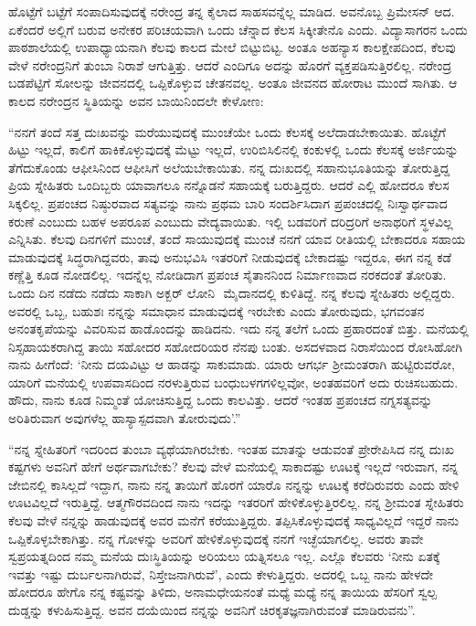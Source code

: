 ಹೊಟ್ಟೆಗೆ ಬಟ್ಟೆಗೆ ಸಂಪಾದಿಸುವುದಕ್ಕೆ ನರೇಂದ್ರ ತನ್ನ ಕೈಲಾದ ಸಾಹಸವನ್ನೆಲ್ಲ ಮಾಡಿದ. ಅವನೊಬ್ಬ ಪ್ರಿಮೇಸನ್ ಆದ. ಏಕೆಂದರೆ ಅಲ್ಲಿಗೆ ಬರುವ ಅನೇಕರ ಪರಿಚಯವಾಗಿ ಒಂದು ಚೆನ್ನಾದ ಕೆಲಸ ಸಿಕ್ಕೀತೇನೊ ಎಂದು. ವಿದ್ಯಾಸಾಗರನ ಒಂದು ಪಾಠಶಾಲೆಯಲ್ಲಿ ಉಪಾಧ್ಯಾಯನಾಗಿ ಕೆಲವು ಕಾಲದ ಮೇಲೆ ಬಿಟ್ಟುಬಿಟ್ಟ. ಅಂತೂ ಅಹನ್ಯಾಸ ಕಾಲಕ್ಷೇಪದಿಂದ, ಕೆಲವು ವೇಳೆ ನರೇಂದ್ರನಿಗೆ ತುಂಬಾ ನಿರಾಶೆ ಆಗುತ್ತಿತ್ತು. ಆದರೆ ಎಂದಿಗೂ ಅದನ್ನು ಹೊರಗೆ ವ್ಯಕ್ತಪಡಿಸುತ್ತಿರಲಿಲ್ಲ. ನರೇಂದ್ರ ಬಡಪೆಟ್ಟಿಗೆ ಸೋಲನ್ನು ಜೀವನದಲ್ಲಿ ಒಪ್ಪಿಕೊಳ್ಳುವ ಚೇತನವಲ್ಲ. ಅಂತೂ ಜೀವನದ ಹೋರಾಟ ಮುಂದೆ ಸಾಗಿತು. ಆ ಕಾಲದ ನರೇಂದ್ರನ ಸ್ಥಿತಿಯನ್ನು ಅವನ ಬಾಯಿನಿಂದಲೇ ಕೇಳೋಣ:

“ನನಗೆ ತಂದೆ ಸತ್ತ ದುಃಖವನ್ನು ಮರೆಯುವುದಕ್ಕೆ ಮುಂಚೆಯೇ ಒಂದು ಕೆಲಸಕ್ಕೆ ಅಲೆದಾಡಬೇಕಾಯಿತು. ಹೊಟ್ಟೆಗೆ ಹಿಟ್ಟು ಇಲ್ಲದೆ, ಕಾಲಿಗೆ ಹಾಕಿಕೊಳ್ಳುವುದಕ್ಕೆ ಮೆಟ್ಟು ಇಲ್ಲದೆ, ಉರಿಬಿಸಿಲಿನಲ್ಲಿ ಕಂಕುಳಲ್ಲಿ ಒಂದು ಕೆಲಸಕ್ಕೆ ಅರ್ಜಿಯನ್ನು ತೆಗೆದುಕೊಂಡು ಆಫೀಸಿನಿಂದ ಆಫೀಸಿಗೆ ಅಲೆಯಬೇಕಾಯಿತು. ನನ್ನ ದುಃಖದಲ್ಲಿ ಸಹಾನುಭೂತಿಯನ್ನು ತೋರುತ್ತಿದ್ದ ಪ್ರಿಯ ಸ್ನೇಹಿತರು ಒಂದಿಬ್ಬರು ಯಾವಾಗಲೂ ನನ್ನೊಡನೆ ಸಹಾಯಕ್ಕೆ ಬರುತ್ತಿದ್ದರು. ಆದರೆ ಎಲ್ಲಿ ಹೋದರೂ ಕೆಲಸ ಸಿಕ್ಕಲಿಲ್ಲ. ಪ್ರಪಂಚದ ನಿಷ್ಠುರವಾದ ಸತ್ಯವನ್ನು ನಾನು ಪ್ರಥಮ ಬಾರಿ ಸಂದರ್ಶಿಸಿದಾಗ ಪ್ರಪಂಚದಲ್ಲಿ ನಿಃಸ್ವಾರ್ಥವಾದ ಕರುಣೆ ಎಂಬುದು ಬಹಳ ಅಪರೂಪ ಎಂಬುದು ವೇದ್ಯವಾಯಿತು. ಇಲ್ಲಿ ಬಡವರಿಗೆ ದರಿದ್ರರಿಗೆ ಅನಾಥರಿಗೆ ಸ್ಥಳವಿಲ್ಲ ಎನ್ನಿಸಿತು. ಕೆಲವು ದಿನಗಳಿಗೆ ಮುಂಚೆ, ತಂದೆ ಸಾಯುವುದಕ್ಕೆ ಮುಂಚೆ ನನಗೆ ಯಾವ ರೀತಿಯಲ್ಲಿ ಬೇಕಾದರೂ ಸಹಾಯ ಮಾಡುವುದಕ್ಕೆ ಸಿದ್ಧರಾಗಿದ್ದವರು, ತಾವು ಅನುಭವಿಸಿ ಇತರರಿಗೆ ನೀಡುವುದಕ್ಕೆ ಬೇಕಾದಷ್ಟು ಇದ್ದರೂ, ಈಗ ನನ್ನ ಕಡೆ ಕಣ್ಣೆತ್ತಿ ಕೂಡ ನೋಡಲಿಲ್ಲ. ಇದನ್ನೆಲ್ಲ ನೋಡಿದಾಗ ಪ್ರಪಂಚ ಸೈತಾನನಿಂದ ನಿರ್ಮಾಣವಾದ ನರಕದಂತೆ ತೋರಿತು. ಒಂದು ದಿನ ನಡೆದು ನಡೆದು ಸಾಕಾಗಿ ಅಕ್ಬರ್ ಲೋನಿ ‍ ಮೈದಾನದಲ್ಲಿ ಕುಳಿತಿದ್ದೆ. ನನ್ನ ಕೆಲವು ಸ್ನೇಹಿತರು ಅಲ್ಲಿದ್ದರು. ಅವರಲ್ಲಿ ಒಬ್ಬ, ಬಹುಶಃ ನನ್ನನ್ನು ಸಮಾಧಾನ ಮಾಡುವುದಕ್ಕೆ ಇರಬೇಕು ಎಂದು ತೋರುವುದು, ಭಗವಂತನ ಅನಂತಕೃಪೆಯನ್ನು ವಿವರಿಸುವ ಹಾಡೊಂದನ್ನು ಹಾಡಿದನು. ಇದು ನನ್ನ ತಲೆಗೆ ಒಂದು ಪ್ರಹಾರದಂತೆ ಬಿತ್ತು. ಮನೆಯಲ್ಲಿ ನಿಸ್ಸಹಾಯಕರಾಗಿದ್ದ ತಾಯಿ ಸಹೋದರ ಸಹೋದರಿಯರ ನೆನಪು ಬಂತು. ಅಸದಳವಾದ ನಿರಾಸೆಯಿಂದ ರೋಸಿಹೋಗಿ ನಾನು ಹೀಗೆಂದೆ: ‘ನೀನು ದಯವಿಟ್ಟು ಆ ಹಾಡನ್ನು ಸಾಕುಮಾಡು. ಯಾರು ಆಗರ್ಭ ಶ‍್ರೀಮಂತರಾಗಿ ಹುಟ್ಟಿರುವರೋ, ಯಾರಿಗೆ ಮನೆಯಲ್ಲಿ ಉಪವಾಸದಿಂದ ನರಳುತ್ತಿರುವ ಬಂಧುಬಳಗಗಳಿಲ್ಲವೋ, ಅಂತಹವರಿಗೆ ಅದು ರುಚಿಸಬಹುದು. ಹೌದು, ನಾನು ಕೂಡ ನಿಮ್ಮಂತೆ ಯೋಚಿಸುತ್ತಿದ್ದ ಒಂದು ಕಾಲವಿತ್ತು. ಆದರೆ ಇಂತಹ ಪ್ರಪಂಚದ ನಗ್ನಸತ್ಯವನ್ನು ಅರಿತಿರುವಾಗ ಅವುಗಳೆಲ್ಲ ಹಾಸ್ಯಾಸ್ಪದವಾಗಿ ತೋರುವುದು’.”

“ನನ್ನ ಸ್ನೇಹಿತರಿಗೆ ಇದರಿಂದ ತುಂಬಾ ವ್ಯಥೆಯಾಗಿರಬೇಕು. ಇಂತಹ ಮಾತನ್ನು ಆಡುವಂತೆ ಪ್ರೇರೇಪಿಸಿದ ನನ್ನ ದುಃಖ ಕಷ್ಟಗಳು ಅವನಿಗೆ ಹೇಗೆ ಅರ್ಥವಾಗಬೇಕು? ಕೆಲವು ವೇಳೆ ಮನೆಯಲ್ಲಿ ಸಾಕಾದಷ್ಟು ಊಟಕ್ಕೆ ಇಲ್ಲದೆ ಇರುವಾಗ, ನನ್ನ ಜೇಬಿನಲ್ಲಿ ಕಾಸಿಲ್ಲದೆ ಇದ್ದಾಗ, ನಾನು ನನ್ನ ತಾಯಿಗೆ ಹೊರಗೆ ಯಾರೊ ನನ್ನನ್ನು ಊಟಕ್ಕೆ ಕರೆದಿರುವರು ಎಂದು ಹೇಳಿ ಊಟವಿಲ್ಲದೆ ಇರುತ್ತಿದ್ದೆ. ಆತ್ಮಗೌರವದಿಂದ ನಾನು ಇದನ್ನು ಇತರರಿಗೆ ಹೇಳಿಕೊಳ್ಳುತ್ತಿರಲಿಲ್ಲ. ನನ್ನ ಶ‍್ರೀಮಂತ ಸ್ನೇಹಿತರು ಕೆಲವು ವೇಳೆ ನನ್ನನ್ನು ಹಾಡುವುದಕ್ಕೆ ಅವರ ಮನೆಗೆ ಕರೆಯುತ್ತಿದ್ದರು. ತಪ್ಪಿಸಿಕೊಳ್ಳುವುದಕ್ಕೆ ಸಾಧ್ಯವಿಲ್ಲದೆ ಇದ್ದರೆ ನಾನು ಒಪ್ಪಿಕೊಳ್ಳಬೇಕಾಗಿತ್ತು. ನನ್ನ ಗೋಳನ್ನು ಅವರಿಗೆ ಹೇಳಿಕೊಳ್ಳುವುದಕ್ಕೆ ನನಗೆ ಇಚ್ಛೆಯಾಗಲಿಲ್ಲ. ಅವರು ತಾವೇ ಸ್ವಪ್ರಯತ್ನದಿಂದ ನಮ್ಮ ಮನೆಯ ದುಃಸ್ಥಿತಿಯನ್ನು ಅರಿಯಲು ಯತ್ನಿಸಲೂ ಇಲ್ಲ. ಎಲ್ಲೊ ಕೆಲವರು ‘ನೀನು ಏತಕ್ಕೆ ಇವತ್ತು ಇಷ್ಟು ದುರ್ಬಲನಾಗಿರುವೆ, ನಿಸ್ತೇಜನಾಗಿರುವೆ’, ಎಂದು ಕೇಳುತ್ತಿದ್ದರು. ಅದರಲ್ಲಿ ಒಬ್ಬ ನಾನು ಹೇಳದೇ ಹೋದರೂ ಹೇಗೊ ನನ್ನ ಕಷ್ಟವನ್ನು ತಿಳಿದು, ಅನಾಮಧೇಯನಂತೆ ಮಧ್ಯೆ ಮಧ್ಯೆ ನನ್ನ ತಾಯಿಯ ಹೆಸರಿಗೆ ಸ್ವಲ್ಪ ದುಡ್ಡನ್ನು ಕಳುಹಿಸುತ್ತಿದ್ದ. ಅವನ ದಯೆಯಿಂದ ನನ್ನನ್ನು ಅವನಿಗೆ ಚಿರಕೃತಜ್ಞನಾಗಿರುವಂತೆ ಮಾಡಿರುವನು”.

